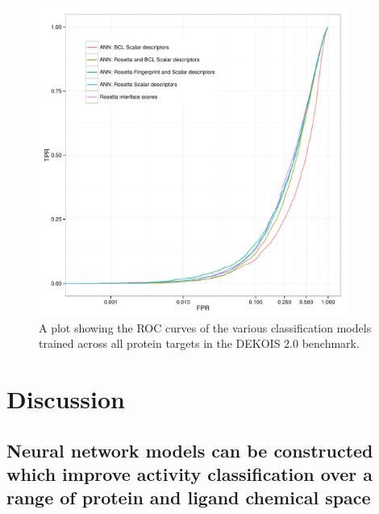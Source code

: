 \begin{figure}
\centering
\includegraphics[width=4in]{figures/hts/tpr_fpr_overall.pdf}
\caption{
A plot showing the \acs{ROC} curves of the various classification models trained across all protein targets in the DEKOIS 2.0 benchmark.
}
\label{fig:tpr_fpr_overall}
\end{figure}

\section{Discussion}

\subsection{Neural network models can be constructed which improve activity classification over a range of protein and ligand chemical space}

